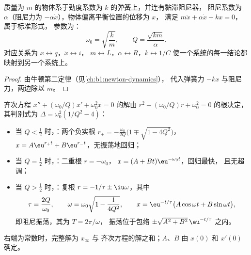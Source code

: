 \begin{proposition}[机械振子]\label{prop:b1:transient-regimes:mechanical}
质量为 $m$ 的物体系于劲度系数为 $k$ 的弹簧上，并连有黏滞阻尼器，
阻尼系数为 $\alpha$（阻尼力为 $-\alpha\dot x$），物体偏离平衡位置的位移为 $x$，
满足 $m\ddot x + \alpha\dot x + kx = 0$，属于标准形式，
参数为：
\[
\omega_0 = \sqrt{\frac{k}{m}}, \qquad Q = \frac{\sqrt{km}}{\alpha} .
\]
对应关系为 $x \leftrightarrow q$，$\dot x \leftrightarrow i$，
$m \leftrightarrow L$，$\alpha \leftrightarrow R$，$k \leftrightarrow 1/C$
使一个系统的每一结论都映射到另一个系统上。
\end{proposition}

\begin{proof}
由牛顿第二定律（见\cref{ch:b1:newton-dynamics}），
代入弹簧力 $-kx$ 与阻尼力，两边除以 $m$。
\end{proof}

\begin{theorem}[三种情形]\label{thm:b1:transient-regimes:regimes}
齐次方程 $x'' + (\omega_0/Q)x' +
\omega_0^2 x = 0$ 的解由 $r^2 + (\omega_0/Q)r +
\omega_0^2 = 0$ 的根决定，其判别式为 $\Delta = \omega_0^2(1/Q^2 - 4)$：
\begin{itemize}
  \item 当 $Q < \tfrac12$ 时，\emph{}：两个负实根
        $r_\pm = -\frac{\omega_0}{2Q}\big(1 \mp \sqrt{1 - 4Q^2}\big)$，
        $x = A\eu^{r_+t} + B\eu^{r_-t}$，无振荡地回归；
  \item 当 $Q = \tfrac12$ 时，\emph{}：二重根 $r = -\omega_0$，
        $x = (A + Bt)\eu^{-\omega_0 t}$，回归最快，
        且无超调；
  \item 当 $Q > \tfrac12$ 时，\emph{}：复根
        $r = -1/\tau \pm \iu\omega$，其中
        \[
        \tau = \frac{2Q}{\omega_0}, \qquad
        \omega = \omega_0\sqrt{1 - \frac{1}{4Q^2}},
        \qquad
        x = \eu^{-t/\tau}\big(A\cos\omega t + B\sin\omega t\big),
        \]
        即阻尼振荡，其\emph{}为 $T = 2\pi/\omega$，
        振荡位于包络 $\pm\sqrt{A^2 + B^2}\,\eu^{-t/\tau}$ 之内。
\end{itemize}
右端为常数时，完整解为 $x_\infty$ 与
齐次方程的解之和；$A$、$B$ 由 $x(0)$ 和 $x'(0)$ 确定。
\end{theorem}

